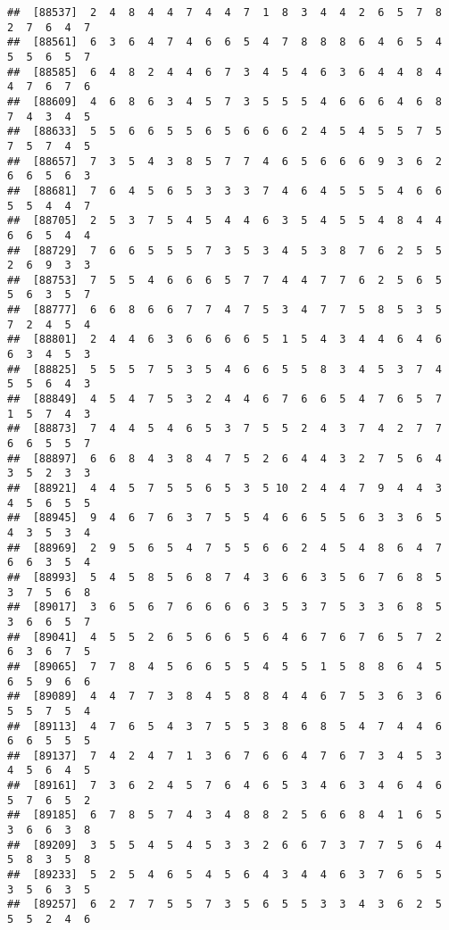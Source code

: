 \documentclass[
]{book}
\begin{document}
\begin{verbatim}
##  [88537]  2  4  8  4  4  7  4  4  7  1  8  3  4  4  2  6  5  7  8  2  7  6  4  7
##  [88561]  6  3  6  4  7  4  6  6  5  4  7  8  8  8  6  4  6  5  4  5  5  6  5  7
##  [88585]  6  4  8  2  4  4  6  7  3  4  5  4  6  3  6  4  4  8  4  4  7  6  7  6
##  [88609]  4  6  8  6  3  4  5  7  3  5  5  5  4  6  6  6  4  6  8  7  4  3  4  5
##  [88633]  5  5  6  6  5  5  6  5  6  6  6  2  4  5  4  5  5  7  5  7  5  7  4  5
##  [88657]  7  3  5  4  3  8  5  7  7  4  6  5  6  6  6  9  3  6  2  6  6  5  6  3
##  [88681]  7  6  4  5  6  5  3  3  3  7  4  6  4  5  5  5  4  6  6  5  5  4  4  7
##  [88705]  2  5  3  7  5  4  5  4  4  6  3  5  4  5  5  4  8  4  4  6  6  5  4  4
##  [88729]  7  6  6  5  5  5  7  3  5  3  4  5  3  8  7  6  2  5  5  2  6  9  3  3
##  [88753]  7  5  5  4  6  6  6  5  7  7  4  4  7  7  6  2  5  6  5  5  6  3  5  7
##  [88777]  6  6  8  6  6  7  7  4  7  5  3  4  7  7  5  8  5  3  5  7  2  4  5  4
##  [88801]  2  4  4  6  3  6  6  6  6  5  1  5  4  3  4  4  6  4  6  6  3  4  5  3
##  [88825]  5  5  5  7  5  3  5  4  6  6  5  5  8  3  4  5  3  7  4  5  5  6  4  3
##  [88849]  4  5  4  7  5  3  2  4  4  6  7  6  6  5  4  7  6  5  7  1  5  7  4  3
##  [88873]  7  4  4  5  4  6  5  3  7  5  5  2  4  3  7  4  2  7  7  6  6  5  5  7
##  [88897]  6  6  8  4  3  8  4  7  5  2  6  4  4  3  2  7  5  6  4  3  5  2  3  3
##  [88921]  4  4  5  7  5  5  6  5  3  5 10  2  4  4  7  9  4  4  3  4  5  6  5  5
##  [88945]  9  4  6  7  6  3  7  5  5  4  6  6  5  5  6  3  3  6  5  4  3  5  3  4
##  [88969]  2  9  5  6  5  4  7  5  5  6  6  2  4  5  4  8  6  4  7  6  6  3  5  4
##  [88993]  5  4  5  8  5  6  8  7  4  3  6  6  3  5  6  7  6  8  5  3  7  5  6  8
##  [89017]  3  6  5  6  7  6  6  6  6  3  5  3  7  5  3  3  6  8  5  3  6  6  5  7
##  [89041]  4  5  5  2  6  5  6  6  5  6  4  6  7  6  7  6  5  7  2  6  3  6  7  5
##  [89065]  7  7  8  4  5  6  6  5  5  4  5  5  1  5  8  8  6  4  5  6  5  9  6  6
##  [89089]  4  4  7  7  3  8  4  5  8  8  4  4  6  7  5  3  6  3  6  5  5  7  5  4
##  [89113]  4  7  6  5  4  3  7  5  5  3  8  6  8  5  4  7  4  4  6  6  6  5  5  5
##  [89137]  7  4  2  4  7  1  3  6  7  6  6  4  7  6  7  3  4  5  3  4  5  6  4  5
##  [89161]  7  3  6  2  4  5  7  6  4  6  5  3  4  6  3  4  6  4  6  5  7  6  5  2
##  [89185]  6  7  8  5  7  4  3  4  8  8  2  5  6  6  8  4  1  6  5  3  6  6  3  8
##  [89209]  3  5  5  4  5  4  5  3  3  2  6  6  7  3  7  7  5  6  4  5  8  3  5  8
##  [89233]  5  2  5  4  6  5  4  5  6  4  3  4  4  6  3  7  6  5  5  3  5  6  3  5
##  [89257]  6  2  7  7  5  5  7  3  5  6  5  5  3  3  4  3  6  2  5  5  5  2  4  6

\end{verbatim}
\end{document}
